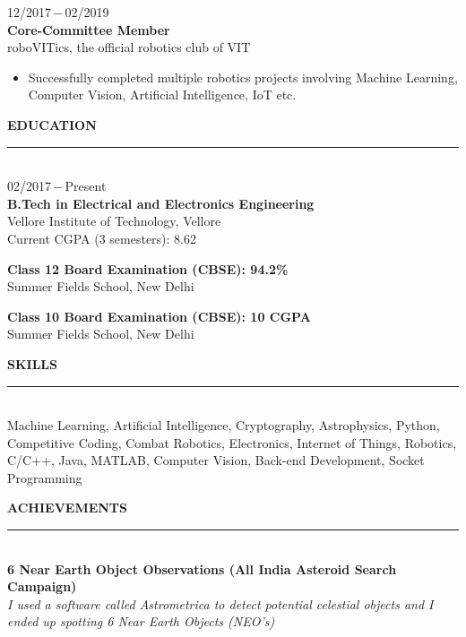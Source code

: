 \documentclass[a4paper, 12pt]{article}
\begin{document}
    \begin{flushleft}
        12/2017\,$-$\,02/2019\\
        \textbf{Core-Committee Member}\\
        roboVITics, the official robotics club of VIT
        \begin{itemize}
            \item Successfully completed multiple robotics projects involving Machine Learning, Computer Vision, Artificial Intelligence, IoT etc.
        \end{itemize}
    \end{flushleft}

    \begin{flushleft}
        \textbf{EDUCATION}\\\noindent\rule{\textwidth}{1pt}\\
        02/2017\,$-$\,Present\\
        \textbf{B.Tech in Electrical and Electronics Engineering}\\
        Vellore Institute of Technology, Vellore\\ Current CGPA (3 semesters): 8.62
    \end{flushleft}
    
    \begin{flushleft}
        \textbf{Class 12 Board Examination (CBSE): 94.2\%}\\Summer Fields School, New Delhi
    \end{flushleft}
    
    \begin{flushleft}
        \textbf{Class 10 Board Examination (CBSE): 10 CGPA}\\Summer Fields School, New Delhi
    \end{flushleft}
    
    \begin{flushleft}
        \textbf{SKILLS}\\\noindent\rule{\textwidth}{1pt}\\Machine Learning, Artificial Intelligence, Cryptography, Astrophysics, Python, Competitive Coding, Combat Robotics, Electronics, Internet of Things, Robotics, C/C++, Java, MATLAB, Computer Vision, Back-end Development, Socket Programming
    \end{flushleft}
    
    \begin{flushleft}
        \textbf{ACHIEVEMENTS}\\\noindent\rule{\textwidth}{1pt}\\\textbf{6 Near Earth Object Observations (All India Asteroid Search Campaign)}\\\textit{I used a software called Astrometrica to detect potential celestial objects and I ended up spotting 6 Near Earth Objects (NEO's)}
    \end{flushleft}
    
\end{document}
